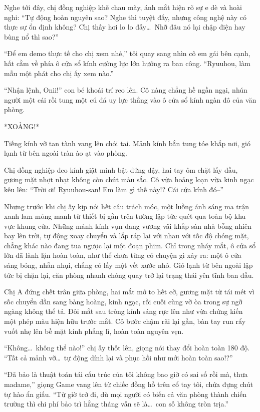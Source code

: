 \documentclass[../main.tex]{subfiles}
\begin{document}
Nghe tới đây, chị đồng nghiệp khẽ chau mày, ánh mắt hiện rõ sự e dè và hoài nghi: ``Tự động hoàn nguyên sao? Nghe thì tuyệt đấy, nhưng công nghệ này có thực sự ổn định không? Chị thấy hơi lo lo đấy\dots\ Nhỡ đâu nó lại chập điện hay bùng nổ thì sao?''

``Để em demo thực tế cho chị xem nhé,'' tôi quay sang nhìn cô em gái bên cạnh, hất cằm về phía ô cửa sổ kính cường lực lớn hướng ra ban công. ``Ryuuhou, làm mẫu một phát cho chị ấy xem nào.''

``Nhận lệnh, Onii!'' con bé khoái trí reo lên. Cô nàng chẳng hề ngần ngại, nhún người một cái rồi tung một cú đá uy lực thẳng vào ô cửa sổ kính ngàn đô của văn phòng.

*XOẢNG!*

Tiếng kính vỡ tan tành vang lên chói tai. Mảnh kính bắn tung tóe khắp nơi, gió lạnh từ bên ngoài tràn ào ạt vào phòng.

Chị đồng nghiệp đeo kính giật mình bật đứng dậy, hai tay ôm chặt lấy đầu, gương mặt nhợt nhạt không còn chút màu sắc. Cô vừa hoảng loạn vừa kinh ngạc kêu lên: ``Trời ơi! Ryuuhou-san! Em làm gì thế này!? Cái cửa kính đó--''

Nhưng trước khi chị ấy kịp nói hết câu trách móc, một luồng ánh sáng ma trận xanh lam mỏng manh từ thiết bị gắn trên tường lập tức quét qua toàn bộ khu vực khung cửa. Những mảnh kính vụn đang vương vãi khắp sàn nhà bỗng nhiên bay lên trời, tự động xoay chuyển và lắp ráp lại với nhau với tốc độ chóng mặt, chẳng khác nào đang tua ngược lại một đoạn phim. Chỉ trong nháy mắt, ô cửa sổ lớn đã lành lặn hoàn toàn, như thể chưa từng có chuyện gì xảy ra: một ô cửa sáng bóng, nhẵn nhụi, chẳng có lấy một vết xước nhỏ. Gió lạnh từ bên ngoài lập tức bị chặn lại, căn phòng nhanh chóng quay trở lại trạng thái yên tĩnh ban đầu.

Chị A đứng chết trân giữa phòng, hai mắt mở to hết cỡ, gương mặt từ tái mét vì sốc chuyển dần sang bàng hoàng, kinh ngạc, rồi cuối cùng vỡ òa trong sự ngỡ ngàng không thể tả. Đôi mắt sau tròng kính sáng rực lên như vừa chứng kiến một phép màu hiện hữu trước mắt. Cô bước chậm rãi lại gần, bàn tay run rẩy vuốt nhẹ lên bề mặt kính phẳng lì, hoàn toàn nguyên vẹn.

``Không\dots\ không thể nào!'' chị ấy thốt lên, giọng nói thay đổi hoàn toàn 180 độ. ``Tất cả mảnh vỡ\dots\ tự động dính lại và phục hồi như mới hoàn toàn sao!?''

``Đã bảo là thuật toán tái cấu trúc của tôi không bao giờ có sai số rồi mà, thưa madame,'' giọng Game vang lên từ chiếc đồng hồ trên cổ tay tôi, chứa đựng chút tự hào ẩn giấu. ``Từ giờ trở đi, dù mọi người có biến cả văn phòng thành chiến trường thì chi phí bảo trì hằng tháng vẫn sẽ là\dots\ con số không tròn trịa.''
\end{document}
